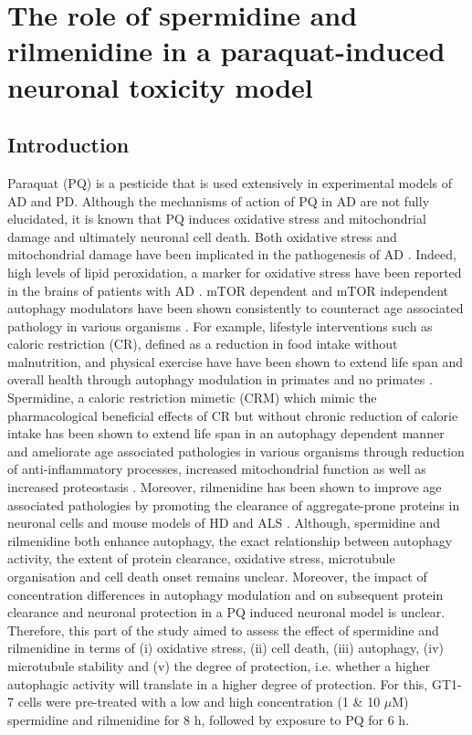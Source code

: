 \chapter{The role of spermidine and rilmenidine in a paraquat-induced neuronal toxicity model}
\section{Introduction}
Paraquat (PQ) is a pesticide that is used extensively in experimental models of AD and PD. Although the mechanisms of action of PQ in AD are not fully elucidated, it is known that PQ induces oxidative stress and mitochondrial damage \citep{Chen2012} and ultimately neuronal cell death. Both oxidative stress and mitochondrial damage have been implicated in the pathogenesis of AD \citep{Chen2012,Lin2006}. Indeed, high levels of lipid peroxidation, a marker for oxidative stress have been reported in the brains of patients with AD \citep{Wang2014,Zhao2013}. mTOR dependent and mTOR independent autophagy modulators have been shown consistently to counteract age associated pathology in various organisms \citep{lumkwana2017}. For example, lifestyle interventions such as caloric restriction (CR), defined as a reduction in food intake without malnutrition,  and physical exercise have have been shown to extend life span and overall health through autophagy modulation in primates and no primates \citep{Law2018,Frederiksen2017,Liu2019,Lin2017}. Spermidine, a caloric restriction mimetic (CRM) which mimic the pharmacological beneficial effects of CR but without chronic reduction of calorie intake has been shown to extend life span in an autophagy dependent manner and ameliorate age associated pathologies in various organisms \citep{Buttner2014,Eisenberg2016a,Gupta2016,Morselli2011,Morselli2009,Sigrist2014,Yue2017,Zhang2017} through reduction of anti-inflammatory processes, increased mitochondrial function as well as increased proteostasis \citep{Madeo2018}. Moreover, rilmenidine has been shown to improve age associated pathologies by promoting the clearance of aggregate-prone proteins in neuronal cells and mouse models of HD and ALS \citep{Perera2018,Rose2010}. Although, spermidine and rilmenidine both enhance autophagy, the exact relationship between autophagy activity, the extent of protein clearance, oxidative stress, microtubule organisation and cell death onset remains unclear. Moreover, the impact of concentration differences in autophagy modulation and on subsequent protein clearance and neuronal protection in a PQ induced neuronal model is unclear. Therefore, this part of the study aimed to assess the effect of spermidine and rilmenidine in terms of (i) oxidative stress, (ii) cell death, (iii) autophagy, (iv) microtubule stability and (v) the degree of protection, i.e. whether a higher autophagic activity will translate in a higher degree of protection. For this, GT1-7 cells were pre-treated with a low and high concentration (1 \& 10 $\mu$M) spermidine and rilmenidine for 8 h, followed by exposure to PQ for 6 h.

